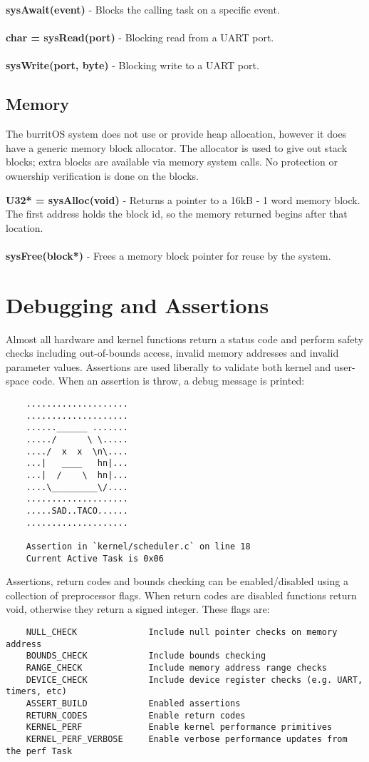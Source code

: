 \documentclass[twoside,a4paper]{refart}
\begin{document}
\textbf{sysAwait(event)} - Blocks the calling task on a specific event.\\\\
\textbf{char = sysRead(port)} - Blocking read from a UART port.\\\\
\textbf{sysWrite(port, byte)} - Blocking write to a UART port.

\subsection{Memory}

The burritOS system does not use or provide heap allocation, however it does have a generic memory block allocator. The allocator is used to give out stack blocks; extra blocks are available via memory system calls. No protection or ownership verification is done on the blocks.

\textbf{U32* = sysAlloc(void)} - Returns a pointer to a 16kB - 1 word memory block. The first address holds the block id, so the memory returned begins after that location.\\\\
\textbf{sysFree(block*)} - Frees a memory block pointer for reuse by the system.

\section{Debugging and Assertions}
 Almost all hardware and kernel functions return a status code and perform safety checks including out-of-bounds access, invalid memory addresses and invalid parameter values. Assertions are used liberally to validate both kernel and user-space code. When an assertion is throw, a debug message is printed:

\begin{verbatim}
    ....................
    ....................
    ......______ .......
    ...../      \ \.....
    ..../  x  x  \n\....
    ...|   ____   hn|...
    ...|  /    \  hn|...
    ....\_________\/....
    ....................
    .....SAD..TACO......
    ....................

    Assertion in `kernel/scheduler.c` on line 18
    Current Active Task is 0x06
\end{verbatim}

Assertions, return codes and bounds checking can be enabled/disabled using a collection of preprocessor flags. When return codes are disabled functions return void, otherwise they return a signed integer. These flags are:\\
\begin{verbatim}
    NULL_CHECK              Include null pointer checks on memory address
    BOUNDS_CHECK            Include bounds checking
    RANGE_CHECK             Include memory address range checks
    DEVICE_CHECK            Include device register checks (e.g. UART, timers, etc)
    ASSERT_BUILD            Enabled assertions
    RETURN_CODES            Enable return codes
    KERNEL_PERF             Enable kernel performance primitives
    KERNEL_PERF_VERBOSE     Enable verbose performance updates from the perf Task
\end{verbatim}
\end{document}
